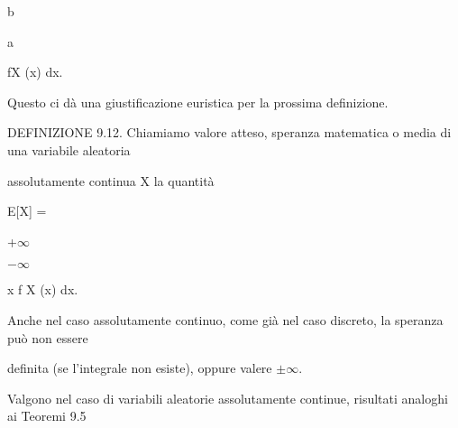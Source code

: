 \documentclass[a4paper,portrait,12pt]{article}
\begin{document}
\begin{flushleft}
b
\end{flushleft}


\begin{flushleft}
a
\end{flushleft}





\begin{flushleft}
fX (x) dx.
\end{flushleft}





\begin{flushleft}
Questo ci d\`{a} una giustificazione euristica per la prossima definizione.
\end{flushleft}


\begin{flushleft}
DEFINIZIONE 9.12. Chiamiamo valore atteso, speranza matematica o media di una variabile aleatoria
\end{flushleft}


\begin{flushleft}
assolutamente continua X la quantit\`{a}
\end{flushleft}


\begin{flushleft}
E[X] =
\end{flushleft}





+$\infty$


$-$$\infty$





\begin{flushleft}
x f X (x) dx.
\end{flushleft}





\begin{flushleft}
Anche nel caso assolutamente continuo, come gi\`{a} nel caso discreto, la speranza pu\`{o} non essere
\end{flushleft}


\begin{flushleft}
definita (se l'integrale non esiste), oppure valere $\pm$$\infty$.
\end{flushleft}


\begin{flushleft}
Valgono nel caso di variabili aleatorie assolutamente continue, risultati analoghi ai Teoremi 9.5
\end{flushleft}
\end{document}
